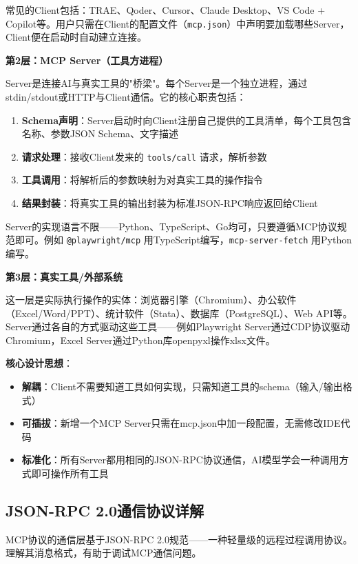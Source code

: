 常见的Client包括：TRAE、Qoder、Cursor、Claude Desktop、VS Code + Copilot等。用户只需在Client的配置文件（\texttt{mcp.json}）中声明要加载哪些Server，Client便在启动时自动建立连接。

\textbf{第2层：MCP Server（工具方进程）}

Server是连接AI与真实工具的"桥梁"。每个Server是一个独立进程，通过stdin/stdout或HTTP与Client通信。它的核心职责包括：

\begin{enumerate}[leftmargin=2em]
  \item \textbf{Schema声明}：Server启动时向Client注册自己提供的工具清单，每个工具包含名称、参数JSON Schema、文字描述
  \item \textbf{请求处理}：接收Client发来的 \texttt{tools/call} 请求，解析参数
  \item \textbf{工具调用}：将解析后的参数映射为对真实工具的操作指令
  \item \textbf{结果封装}：将真实工具的输出封装为标准JSON-RPC响应返回给Client
\end{enumerate}

Server的实现语言不限——Python、TypeScript、Go均可，只要遵循MCP协议规范即可。例如 \texttt{@playwright/mcp} 用TypeScript编写，\texttt{mcp-server-fetch} 用Python编写。

\textbf{第3层：真实工具/外部系统}

这一层是实际执行操作的实体：浏览器引擎（Chromium）、办公软件（Excel/Word/PPT）、统计软件（Stata）、数据库（PostgreSQL）、Web API等。Server通过各自的方式驱动这些工具——例如Playwright Server通过CDP协议驱动Chromium，Excel Server通过Python库openpyxl操作xlsx文件。

\textbf{核心设计思想}：

\begin{itemize}[leftmargin=2em]
  \item \textbf{解耦}：Client不需要知道工具如何实现，只需知道工具的schema（输入/输出格式）
  \item \textbf{可插拔}：新增一个MCP Server只需在mcp.json中加一段配置，无需修改IDE代码
  \item \textbf{标准化}：所有Server都用相同的JSON-RPC协议通信，AI模型学会一种调用方式即可操作所有工具
\end{itemize}

\subsection{JSON-RPC 2.0通信协议详解}

MCP协议的通信层基于JSON-RPC 2.0规范——一种轻量级的远程过程调用协议。理解其消息格式，有助于调试MCP通信问题。

